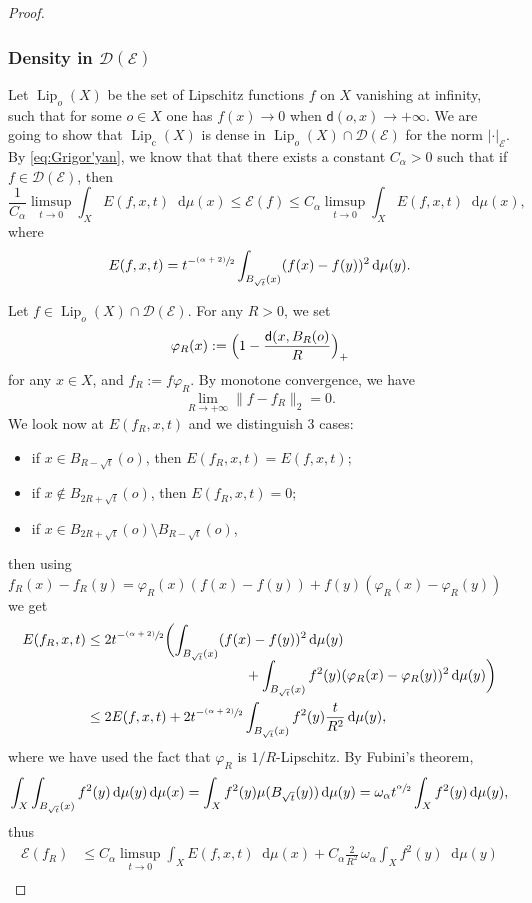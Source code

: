 \documentclass[JEP,XML,SOM,Unicode,published]{cedram}
\newcommand{\rmc}{\mathrm{c}}
\theoremstyle{plain}
\theoremstyle{definition}
\newcommand{\cE}{\mathcal{E}}
\newcommand{\cD}{\mathcal{D}}
\newcommand{\di}{\mathop{}\!\mathrm{d}}
\DeclareMathOperator{\Lip}{Lip}
\newcommand{\dist}{\mathsf{d}}
\begin{document}
\begin{proof}
\subsubsection*{Density in $\cD(\cE)$} Let $\Lip_o(X)$ be the set of Lipschitz functions $f$ on $X$ vanishing at infinity, \ie such that for some $o \in X$ one has $f(x)\to 0$ when $\dist(o,x)\to+\infty$. We are going to show that $\Lip_\rmc(X)$ is dense in $\Lip_o(X)\cap \cD(\cE)$ for the norm $|\cdot|_{\cE}$. By \eqref{eq:Grigor'yan}, we know that that there exists a constant $C_\alpha>0$ such that if $f\in \cD(\cE)$, then
\[
\frac{1}{C_\alpha}\limsup_{t\to 0}\int_X E(f,x,t)\di\mu(x)\le \cE(f) \le C_\alpha\limsup_{t\to 0}\int_X E(f,x,t)\di\mu(x),
\]
where
\[
E(f,x,t)= t^{-\sfrac{(\alpha+2)}{2}} \int_{B_{\sqrt{t}}(x)}(f(x)-f(y))^2\di \mu(y).
\]

Let $f\in \Lip_o(X)\cap \cD(\cE)$. For any $R>0$, we set
\[
\varphi_R(x):=\Bigl(1-\frac{\dist(x,B_R(o)}{R}\Bigr)_+
\]for any $x \in X$, and $f_R:= f \varphi_R$.
By monotone convergence, we have
\[
\lim_{R\to +\infty} \|f-f_R\|_2=0.
\]
We look now at $E(f_R,x,t)$ and we distinguish 3 cases:
\begin{itemize}
\item if $x\in B_{R-\sqrt{t}}(o)$, then $E(f_R,x,t)=E(f,x,t)$;
\item if $x\not\in B_{2R+\sqrt{t}}(o)$, then $E(f_R,x,t)=0$;
\item if $x\in B_{2R+\sqrt{t}}(o)\setminus B_{R-\sqrt{t}}(o)$,
\end{itemize}
then using $f_R(x)-f_R(y)=\varphi_R(x)(f(x)-f(y))+f(y)(\varphi_R(x)-\varphi_R(y))$ we get
\begin{align*}
E(f_R,x,t)&\le 2 t^{-\sfrac{(\alpha+2)}{2}} \biggl(\int_{B_{\sqrt{t}}(x)}(f(x)-f(y))^2\di \mu(y)\\[-5pt]
&\hspace*{4cm}+\int_{B_{\sqrt{t}}(x)}f^2(y)(\varphi_R(x)-\varphi_R(y))^2\di\mu(y)\biggr)\\
&\le 2E(f,x,t)+ 2 t^{-\sfrac{(\alpha+2)}{2}} \int_{B_{\sqrt{t}}(x)}f^2(y)\frac{t}{R^2}\di\mu(y),
\end{align*}
where we have used the fact that $\varphi_R$ is $1/R$-Lipschitz. By Fubini's theorem,
\[
\int_X \int_{B_{\sqrt{t}}(x)}f^2(y)\di \mu(y) \di \mu(x) = \int_X f^2(y)\mu(B_{\sqrt{t}}(y))\di \mu(y) = \omega_\alpha t^{\sfrac{\alpha}{2}} \int_X f^2(y)\di \mu(y),
\]
thus
\begin{align*}\cE(f_R)&\le C_\alpha \limsup_{t\to 0}\int_{X} E(f,x,t)\di\mu(x)+C_\alpha \frac{2}{R^2}\, \omega_\alpha \int_X f^2(y)\di\mu(y)\\

\end{align*}
\end{proof}
\end{document}
